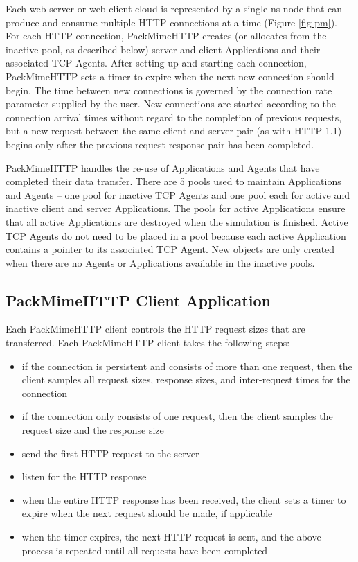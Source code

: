 Each web server or web client cloud is represented by a single ns node
that can produce and consume multiple HTTP connections at a time
(Figure \ref{fig-pm}). For each HTTP connection, PackMimeHTTP creates (or
allocates from the inactive pool, as described below) server and
client Applications and their associated TCP Agents. After setting up
and starting each connection, PackMimeHTTP sets a timer to expire when
the next new connection should begin. The time between new connections
is governed by the connection rate parameter supplied by the user. New
connections are started according to the connection arrival times
without regard to the completion of previous requests, but a new
request between the same client and server pair (as with HTTP 1.1)
begins only after the previous request-response pair has been
completed. 

PackMimeHTTP handles the re-use of Applications and Agents that have
completed their data transfer. There are 5 pools used to maintain
Applications and Agents -- one pool for inactive TCP Agents and one
pool each for active and inactive client and server Applications. The
pools for active Applications ensure that all active Applications are
destroyed when the simulation is finished. Active TCP Agents do not
need to be placed in a pool because each active Application contains a
pointer to its associated TCP Agent. New objects are only created when
there are no Agents or Applications available in the inactive pools. 

\subsection{PackMimeHTTP Client Application}

Each PackMimeHTTP client controls the HTTP request sizes that are
transferred. Each PackMimeHTTP client takes the following steps: 
\begin{itemize}
\item{if the connection is persistent and consists of more than one
  request, then the client samples all request sizes, response sizes,
  and inter-request times for the connection}
\item{if the connection only consists of one request, then the client
  samples the request size and the response size}
\item{send the first HTTP request to the server}
\item{listen for the HTTP response}
\item{when the entire HTTP response has been received, the client sets
a timer to expire when the next request should be made, if applicable}
\item{when the timer expires, the next HTTP request is sent, and the
above process is repeated until all requests have been completed}
\end{itemize}

